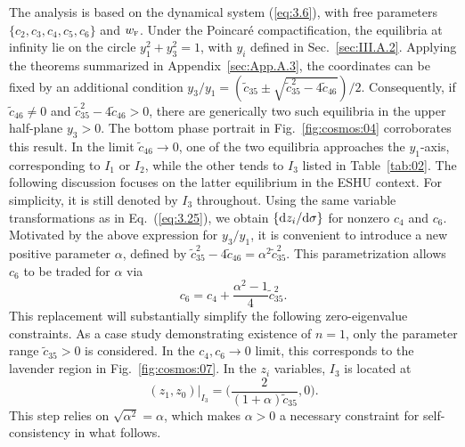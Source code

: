 \documentclass[aps,prd,twocolumn]{revtex4-2}
\newcommand\dx{{\rm d}}
\newcommand\subF{\textsc{f}}
\begin{document}
The analysis is based on the dynamical system (\ref{eq:3.6}), with free parameters $\{c_2,c_3,c_4,c_5,c_6\}$ and $w_\subF$. Under the Poincar\'e compactification, the equilibria at infinity lie on the circle $y_1^2+y_3^2=1$, with $y_i$ defined in Sec.~\ref{sec:III.A.2}. Applying the theorems summarized in Appendix~\ref{sec:App.A.3}, the coordinates can be fixed by an additional condition $y_3/y_1 = (\tilde{c}_{35} \pm \sqrt{\tilde{c}_{35}^2-4\tilde{c}_{46}})/2$. Consequently, if $\tilde{c}_{46}\neq0$ and $\tilde{c}_{35}^2-4\tilde{c}_{46}>0$, there are generically two such equilibria in the upper half-plane $y_3>0$. The bottom phase portrait in Fig.~\ref{fig:cosmos:04} corroborates this result. In the limit $\tilde{c}_{46}\rightarrow0$, one of the two equilibria approaches the $y_1$-axis, corresponding to $I_1$ or $I_2$, while the other tends to $I_3$ listed in Table~\ref{tab:02}. The following discussion focuses on the latter equilibrium in the ESHU context. For simplicity, it is still denoted by $I_3$ throughout. Using the same variable transformations as in Eq.~(\ref{eq:3.25}), we obtain $\{\dx z_i/\dx\sigma\}$ for nonzero $c_4$ and $c_6$. Motivated by the above expression for $y_3/y_1$, it is convenient to introduce a new positive parameter $\alpha$, defined by $\tilde{c}_{35}^2-4\tilde{c}_{46}=\alpha^2\tilde{c}_{35}^2$. This parametrization allows $c_6$ to be traded for $\alpha$ via
\begin{equation}\label{eq:3.39}
  c_6 = c_4 + \frac{\alpha^2-1}{4}\tilde{c}_{35}^2.
\end{equation}
This replacement will substantially simplify the following zero-eigenvalue constraints. As a case study demonstrating existence of $n=1$, only the parameter range $\tilde{c}_{35}>0$ is considered. In the $c_4,c_6\rightarrow0$ limit, this corresponds to the lavender region in Fig.~\ref{fig:cosmos:07}. In the $z_i$ variables, $I_3$ is located at
\begin{equation}\label{eq:3.40}
  (z_1,z_0)|_{I_3} = \Big(\frac{2}{(1+\alpha)\tilde{c}_{35}},0\Big). 
\end{equation}
This step relies on $\sqrt{\alpha^2}=\alpha$, which makes $\alpha>0$ a necessary constraint for self-consistency in what follows.
\end{document}

